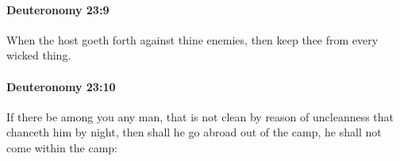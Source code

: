 		\paragraph{Deuteronomy 23:9} %
			\label{DEUTERONOMY-23-9}

			When the host goeth forth against thine enemies, then keep thee from every wicked thing.


		\paragraph{Deuteronomy 23:10} %
			\label{DEUTERONOMY-23-10}

			If there be among you any man, that is not clean by reason of uncleanness that chanceth him by night, then shall he go abroad out of the camp, he shall not come within the camp:


